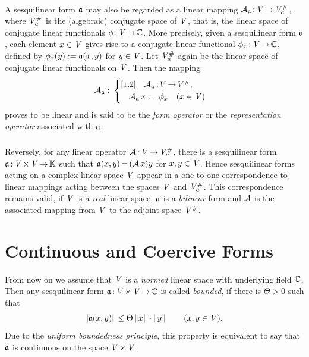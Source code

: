 \documentclass[11pt,twoside]{article}
\begin{document}
\paragraph*{} %
A sesquilinear form $\sql$ may also be regarded
as a linear mapping $\repA\:\vecV \xto \vecV_a^{\#}$,
where $\vecV_a^{\#}$ is the (algebraic) conjugate space of $\vecV$,
that is,
the linear space of conjugate linear functionals $\phi\:\vecV \xto \C$.
More precisely,
given a sesquilinear form $\sql$,
each element $x \in \vecV$ gives rise to a conjugate linear functional
$\phi_x\:\vecV \xto \C$,
defined by $\phi_x(y) := \sql(x,y)$ for $y \in \vecV$.
Let $\vecV_a^{\#}$ again be the linear space
of conjugate linear functionals on $\vecV$.
Then the mapping
\[
\repA: \;
\begin{cases}[1.2]
\quad \repA\:V \xto V^{\#},\\
\quad \repA \, x := \phi_x \quad (x \in \vecV)
\end{cases}
\]
proves to be linear and is said to be the \textit{form operator}
or the \textit{representation operator} associated with $\sql$.

\subparagraph*{}
Reversely,
for any linear operator $\cal{A}\:\vecV \xto \vecV_a^{\#}$,
there is a sesqui\-linear form $\sql\:\vecV \xtimes \vecV \xto \F$
such that $\sql(x,y) \eq (\cal{A} \, x) y$ for $x,y \in \vecV$.
Hence sesquilinear forms acting on a complex linear space $\vecV$
appear in a one-to-one correspondence to linear mappings
acting between the spaces $\vecV$ and $\vecV_a^{\#}$.
This correspondence remains valid,
if $\vecV$ is a \textit{real} linear space,
$\sql$ is a \textit{bilinear} form
and $\cal{A}$ is the associated mapping
from $\vecV$ to the adjoint space $\vecV^{\#}$.

\section{Continuous and Coercive Forms}                                        %
From now on we assume that $\vecV$ is a \textit{normed} linear space
with underlying field $\C$.
Then any sesquilinear form $\sql\:\vecV \xtimes \vecV \xto \C$
is called \textit{bounded},
if there is $\Theta > 0$ such that
\[
\abs{\sql(x,y)} \, \leq \Theta \norm{x} \cdot \norm{y}
\quad \quad (x,y \in \vecV).
\]
Due to the \textit{uniform boundedness principle},
this property is equivalent to say
that $\sql$ is continuous on the space $\vecV \xtimes \vecV$.
\end{document}
